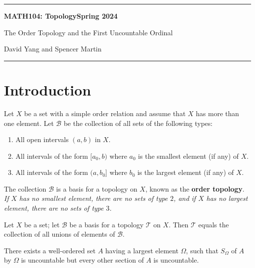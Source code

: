 \documentclass[11pt]{article}
\begin{document}
	\hrule
	\begin{center}
        \textbf{MATH104: Topology}\hfill \textbf{Spring 2024}\newline

		{\Large The Order Topology and the First Uncountable Ordinal}

		David Yang and Spencer Martin
	\end{center}

\hrule

\vspace{1em}

\section{Introduction}

\begin{definition*}
Let $X$ be a set with a simple order relation and assume that $X$ has more than one element. Let $\mathscr{B}$ be the collection of all sets of the following types:
\begin{enumerate}
    \item All open intervals $(a, b)$ in $X$.
    \item All intervals of the form $[a_0, b)$ where $a_0$ is the smallest element (if any) of $X$.
    \item All intervals of the form $(a, b_0]$ where $b_0$ is the largest element (if any) of $X$.
\end{enumerate}

The collection $\mathscr{B}$ is a basis for a topology on $X$, known as the \textbf{order topology}. \\

\textit{If $X$ has no smallest element, there are no sets of type $2$, and if $X$ has no largest element, there are no sets of type $3$.}
\end{definition*}

\begin{lemma*}[13.1, page 80]
Let $X$ be a set; let $\mathscr{B}$ be a basis for a topology $\mathcal{T}$ on $X$. Then $\mathcal{T}$ equals the collection of all unions of elements of $\mathscr{B}$.
\end{lemma*}


\begin{lemma*}[10.2, page 66]
There exists a well-ordered set $A$ having a largest element $\Omega$, such that $S_\Omega$ of $A$ by $\Omega$
is uncountable but every other section of $A$ is uncountable.
\end{lemma*}
\end{document}

